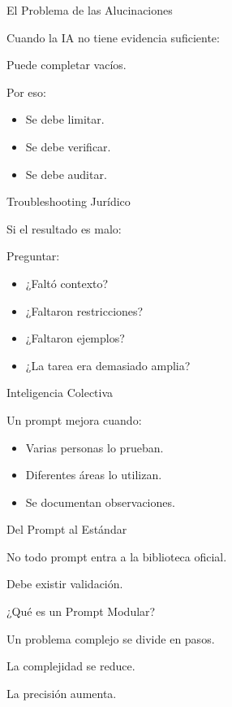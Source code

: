 \documentclass[aspectratio=169]{beamer}
\begin{document}
\begin{frame}{El Problema de las Alucinaciones}


Cuando la IA no tiene evidencia suficiente:

Puede completar vacíos.

Por eso:

\begin{itemize}
  \item Se debe limitar.
  \item Se debe verificar.
  \item Se debe auditar.
\end{itemize}
\end{frame}

\begin{frame}{Troubleshooting Jurídico}


Si el resultado es malo:

Preguntar:

\begin{itemize}
  \item ¿Faltó contexto?
  \item ¿Faltaron restricciones?
  \item ¿Faltaron ejemplos?
  \item ¿La tarea era demasiado amplia?
\end{itemize}
\end{frame}

\begin{frame}{Inteligencia Colectiva}


Un prompt mejora cuando:

\begin{itemize}
  \item Varias personas lo prueban.
  \item Diferentes áreas lo utilizan.
  \item Se documentan observaciones.
\end{itemize}
\end{frame}

\begin{frame}{Del Prompt al Estándar}


No todo prompt entra a la biblioteca oficial.

Debe existir validación.

\end{frame}

\begin{frame}{¿Qué es un Prompt Modular?}


Un problema complejo se divide en pasos.

La complejidad se reduce.

La precisión aumenta.

\end{frame}
\end{document}
